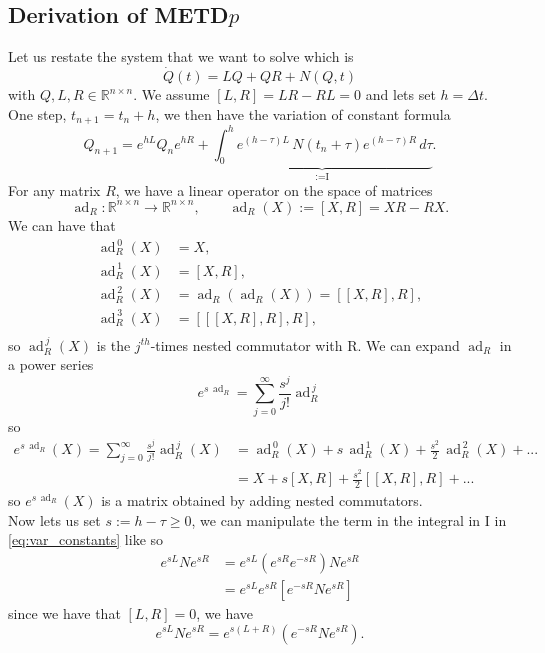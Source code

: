 \documentclass[12pt]{article}
\newcommand{\RR}{\mathds{R}}
\DeclareMathOperator{\ad}{ad}
\begin{document}
\subsection{Derivation of METD$p$}
\label{app:METDp_deriv}
Let us restate the system that we want to solve which is
\begin{equation}
    \dot Q(t) = LQ + QR + N(Q,t)
\end{equation}
with $Q,L,R \in \RR^{n \times n}$. We assume $[L,R] = LR - RL =0$ and lets set $h=\Delta t$. One step, $t_{n+1} = t_n + h$, we then have the variation of constant formula
\begin{equation}
\label{eq:var_constants}
    Q_{n+1} = e^{hL}Q_ne^{hR} + \underbrace{\int_0^h e^{(h-\tau)L}\, N(t_n + \tau)e^{(h-\tau)R}\, d\tau}_\text{:=I} .
\end{equation}
For any matrix $R$, we have a linear operator on the space of matrices 
\begin{equation}
    \ad_R : \RR^{n \times n} \to \RR^{n \times n}, \qquad \ad_R(X) := [X,R] = XR - RX.
\end{equation}
We can have that 
\begin{align*}
    \ad_R^{\,0}(X) &= X,\\
    \ad_R^{\,1}(X) &= [X,R],\\
    \ad_R^{\,2}(X) &= \ad_R(\ad_R(X)) = [[X,R],R],\\
    \ad_R^{\,3}(X) &= [[[X,R],R],R],\\
\end{align*}
so $\ad_R^{\,j}(X)$ is the $j^{th}$-times nested commutator with R. We can expand $\ad_R$ in a power series
\begin{equation}
    e^{s\,\ad_R} = \sum_{j=0}^{\infty}\frac{s^j}{j!}\ad_R^{\,j}
\end{equation}
so 
\begin{align}
    e^{s\,\ad_R}(X) = \sum_{j=0}^{\infty}\frac{s^j}{j!}\ad_R^{\,j} (X) &= \ad_R^{\,0}(X) + s\, \ad_R^{\,1}(X)+ \frac{s^2}{2}\,\ad_R^{\,2}(X) + ...\\
    &= X + s[X,R] + \frac{s^2}{2}[[X,R],R] + ...
\end{align}
so $e^{s\,\ad_R}(X)$ is a matrix obtained by adding nested commutators.\\
Now lets us set $s:= h-\tau \geq 0$, we can manipulate the term in the integral in I in \eqref{eq:var_constants} like so 
\begin{align}
    e^{sL}Ne^{sR} &= e^{sL}(e^{sR}e^{-sR})Ne^{sR}\\
    &=e^{sL}e^{sR}[e^{-sR}Ne^{sR}]
\end{align}
since we have that $[L,R] =0$, we have 
\begin{equation}
\label{eq:1_no_ad}
    e^{sL}Ne^{sR} = e^{s(L+R)}(e^{-sR}Ne^{sR}).
\end{equation}
\end{document}
